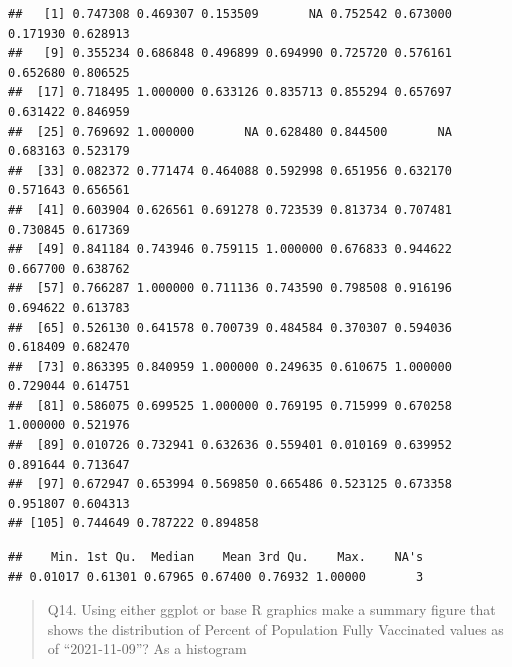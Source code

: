 \documentclass[
]{article}
\newenvironment{Shaded}{\begin{snugshade}}{\end{snugshade}}
\newcommand{\FunctionTok}[1]{\textcolor[rgb]{0.00,0.00,0.00}{#1}}
\newcommand{\NormalTok}[1]{#1}
\newcommand{\SpecialCharTok}[1]{\textcolor[rgb]{0.00,0.00,0.00}{#1}}
\begin{document}
\begin{Shaded}
\end{Shaded}

\begin{verbatim}
##   [1] 0.747308 0.469307 0.153509       NA 0.752542 0.673000 0.171930 0.628913
##   [9] 0.355234 0.686848 0.496899 0.694990 0.725720 0.576161 0.652680 0.806525
##  [17] 0.718495 1.000000 0.633126 0.835713 0.855294 0.657697 0.631422 0.846959
##  [25] 0.769692 1.000000       NA 0.628480 0.844500       NA 0.683163 0.523179
##  [33] 0.082372 0.771474 0.464088 0.592998 0.651956 0.632170 0.571643 0.656561
##  [41] 0.603904 0.626561 0.691278 0.723539 0.813734 0.707481 0.730845 0.617369
##  [49] 0.841184 0.743946 0.759115 1.000000 0.676833 0.944622 0.667700 0.638762
##  [57] 0.766287 1.000000 0.711136 0.743590 0.798508 0.916196 0.694622 0.613783
##  [65] 0.526130 0.641578 0.700739 0.484584 0.370307 0.594036 0.618409 0.682470
##  [73] 0.863395 0.840959 1.000000 0.249635 0.610675 1.000000 0.729044 0.614751
##  [81] 0.586075 0.699525 1.000000 0.769195 0.715999 0.670258 1.000000 0.521976
##  [89] 0.010726 0.732941 0.632636 0.559401 0.010169 0.639952 0.891644 0.713647
##  [97] 0.672947 0.653994 0.569850 0.665486 0.523125 0.673358 0.951807 0.604313
## [105] 0.744649 0.787222 0.894858
\end{verbatim}

\begin{Shaded}
\end{Shaded}

\begin{verbatim}
##    Min. 1st Qu.  Median    Mean 3rd Qu.    Max.    NA's 
## 0.01017 0.61301 0.67965 0.67400 0.76932 1.00000       3
\end{verbatim}

\begin{quote}
Q14. Using either ggplot or base R graphics make a summary figure that
shows the distribution of Percent of Population Fully Vaccinated values
as of ``2021-11-09''? As a histogram
\end{quote}

\begin{Shaded}
\end{Shaded}
\end{document}
